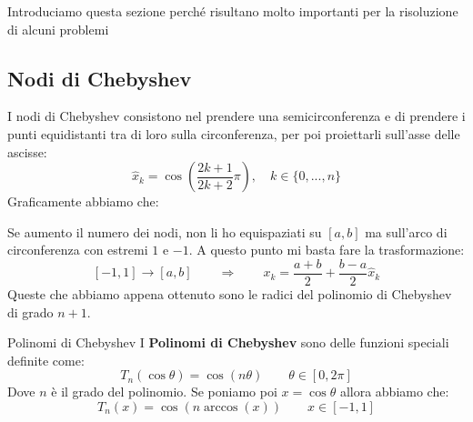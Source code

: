 \documentclass[11pt,a4paper,twoside]{article}
\theoremstyle{definition}
\begin{document}
Introduciamo questa sezione perché risultano molto importanti per la risoluzione di alcuni problemi

\subsection{Nodi di Chebyshev}

I nodi di Chebyshev consistono nel prendere una semicirconferenza e di prendere i punti equidistanti tra di loro sulla circonferenza, per poi proiettarli sull'asse delle ascisse:
\[ \hat x_k = \cos\left( \frac{2k+1}{2k+2} \pi\right), \quad k \in \{0,...,n\} \]
Graficamente abbiamo che:
\begin{center}
\end{center}

Se aumento il numero dei nodi, non li ho equispaziati su $[a,b]$ ma sull'arco di circonferenza con estremi $1$ e $-1$. A questo punto mi basta fare la trasformazione:
\[ [-1,1] \to [a,b] \qquad \Rightarrow \qquad x_k = \frac{a+b}2 + \frac{b-a}2 \hat x_k\]
Queste che abbiamo appena ottenuto sono le radici del polinomio di Chebyshev di grado $n+1$.

\begin{defn}{Polinomi di Chebyshev}{}
	I \textbf{Polinomi di Chebyshev} sono delle funzioni speciali definite come:
	\[ T_n(\cos \theta) = \cos(n \theta)\qquad \theta \in [0, 2 \pi] \]
	Dove $n$ è il grado del polinomio.
	Se poniamo poi $x = \cos \theta$ allora abbiamo che:
	\[ T_n(x) = \cos(n \arccos(x)) \qquad x \in [-1,1]\]
\end{defn}

\newpage
\end{document}
